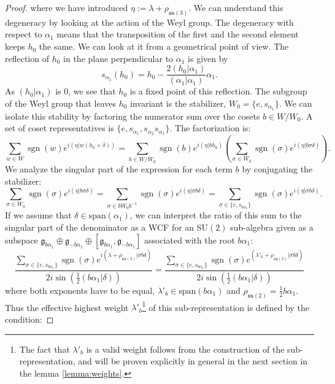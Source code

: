\documentclass[10pt,a4paper]{amsart}
\DeclareMathOperator{\sgn}{sgn}
\newcommand{\su}{\mathfrak{su}}
\begin{document}
\begin{proof}
where we have introduced $\eta := \lambda + \rho_{\su(3)}$. We can understand this degeneracy by looking at the action of the Weyl group. The degeneracy with respect to $\alpha_1$ means that the transposition of the first and the second element keeps $h_0$ the same. We can look at it from a geometrical point of view. The reflection of $h_0$ in the plane perpendicular to $\alpha_1$ is given by
\[
s_{\alpha_1}(h_0) = h_0 - \frac{2(h_0|\alpha_1)}{(\alpha_1|\alpha_1)}\alpha_1.
\]
As $(h_0|\alpha_1)$ is 0, we see that $h_0$ is a fixed point of this reflection. The subgroup of the Weyl group that leaves $h_0$ invariant is the stabilizer, $W_0 = \{e, s_{\alpha_1}\}$. We can isolate this stability by factoring the numerator sum over the cosets $b \in W/W_0$. A set of coset representatives is $\{e, s_{\alpha_1}, s_{\alpha_2}s_{\alpha_1}\}$. The factorization is:
\begin{equation}
    \sum_{w \in W} \sgn(w) e^{i(\eta|w(h_0+\delta))} = \sum_{b \in W/W_0} \sgn(b) e^{i(\eta|bh_0)} \left( \sum_{\sigma \in W_0} \sgn(\sigma) e^{i(\eta|b\sigma\delta)} \right).
\end{equation}
We analyze the singular part of the expression for each term $b$ by conjugating the stabilizer:
\begin{equation}
    \sum_{\sigma \in W_0} \sgn(\sigma) e^{i(\eta|b\sigma\delta)} = \sum_{\sigma \in bW_0b^{-1}} \sgn(\sigma) e^{i(\eta|\sigma b\delta)} = \sum_{\sigma \in \{e, s_{b\alpha_1}\}} \sgn(\sigma) e^{i(\eta|\sigma b\delta)}.
\end{equation}
If we assume that $\delta\in \text{span}(\alpha_1)$, we can interpret the ratio of this sum to the singular part of the denominator as a WCF for an SU$(2)$ sub-algebra given as a subspace $\mathfrak{g}_{b\alpha_1} \oplus \mathfrak{g}_{-b\alpha_1} \oplus [\mathfrak{g}_{b\alpha_1},\mathfrak{g}_{-b\alpha_1}] $  associated with the root $b\alpha_1$:
\begin{equation}
    \frac{\sum_{\sigma \in \{e, s_{b\alpha_1}\}} \sgn(\sigma) e^{i(\lambda + \rho_{\mathfrak{su}(3)}|\sigma b\delta)}}{2i\sin\left(\frac{1}{2}(b\alpha_1|\delta)\right)} = \frac{\sum_{\sigma \in \{e, s_{b\alpha_1}\}} \sgn(\sigma) e^{(\lambda'_b+\rho_{\su(2)}|\sigma b\delta)}}{2i\sin\left(\frac{1}{2}(b\alpha_1|\delta)\right)}
\end{equation}
where both exponents have to be equal, $\lambda'_b \in \text{span} (b\alpha_1)$ and $\rho_{\su(2)}=\frac{1}{2}b\alpha_1$. Thus the effective highest weight $\lambda'_{b}$\footnote{The fact that $\lambda'_b$ is a valid weight follows from the construction of the sub-representation, and will be proven explicitly in general in the next section in the lemma \ref{lemma:weights}.} of this sub-representation is defined by the condition:


\end{proof}
\end{document}
